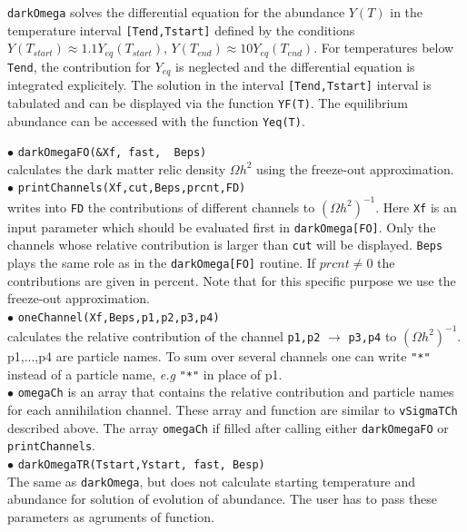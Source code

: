 \documentclass[12pt,a4paper]{article}
\begin{document}
   
\verb|darkOmega| solves the differential equation for the abundance $Y(T)$   in the 
temperature interval {\tt [Tend,Tstart]}  defined by the
conditions $Y(T_{start})\approx 1.1Y_{eq}(T_{start})$,
$Y(T_{end})\approx10Y_{eq}(T_{end})$.  For temperatures below {\tt Tend}, the contribution for  $Y_{eq}$
 is neglected and  the differential equation is integrated
explicitely. The solution in the interval {\tt [Tend,Tstart]}  interval is tabulated and can be displayed  via the
function {\tt YF(T)}. The equilibrium abundance can be accessed  with the function
{\tt Yeq(T)}. 

\noindent
$\bullet$ \verb|darkOmegaFO(&Xf, fast,  Beps)|\\
calculates the  dark matter relic density $\Omega h^2$ using the freeze-out approximation.\\
\noindent
$\bullet$ \verb|printChannels(Xf,cut,Beps,prcnt,FD)|\\   
writes into \verb|FD| the  contributions  of different channels to $(\Omega
h^2)^{-1}$. Here \verb|Xf| is an input parameter which should
be  evaluated first in \verb|darkOmega[FO]|. Only  the channels whose
relative contribution is larger than  \verb|cut| will be displayed. \verb|Beps|
plays the same role as in the \verb|darkOmega[FO]| routine.
If $prcnt\ne 0$ the contributions are given in percent.
Note that  for this specific purpose  we use the
freeze-out approximation.\\
$\bullet$ \verb|oneChannel(Xf,Beps,p1,p2,p3,p4)|\\   
calculates the relative   contribution of the  channel \verb|p1,p2| $\to$ \verb|p3,p4|
to $(\Omega h^2)^{-1}$. p1,...,p4 are particle names.  To 
sum over several channels one can write  \verb|"*"| instead 
of  a particle name, {\it e.g} \verb|"*"| in place of p1.\\
\noindent
$\bullet$ \verb|omegaCh| is an array that contains the relative contribution and particle names for each
annihilation channel. These array and function
are similar to {\tt vSigmaTCh} described above. The array {\tt omegaCh} if filled after calling either
{\tt darkOmegaFO} or {\tt printChannels}. \\

\noindent
$\bullet$ \verb|darkOmegaTR(Tstart,Ystart, fast, Besp)|\\
The same as \verb|darkOmega|, but does not calculate  starting temperature and abundance for solution of evolution of abundance. 
The user has to pass these parameters as agruments of function. 
\end{document}

